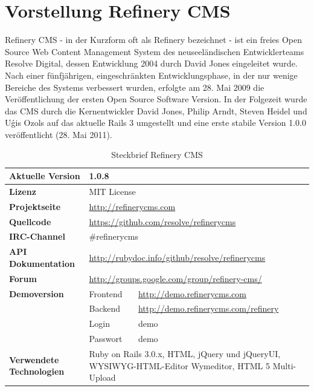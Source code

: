 \section{Vorstellung Refinery CMS}
Refinery CMS - in der Kurzform oft als Refinery bezeichnet - ist ein freies Open Source Web Content Management System des neuseeländischen Entwicklerteams Resolve Digital, dessen Entwicklung 2004 durch David Jones eingeleitet wurde. Nach einer fünfjährigen, eingeschränkten Entwicklungsphase, in der nur wenige Bereiche des Systems verbessert wurden, erfolgte am 28. Mai 2009 die Veröffentlichung der ersten Open Source Software Version. In der Folgezeit wurde das CMS durch die Kernentwickler David Jones, Philip Arndt, Steven Heidel und U\'{g}is Ozols auf das aktuelle Rails 3 umgestellt und eine erste stabile Version 1.0.0 veröffentlicht (28. Mai 2011).
\begin{table}[!h]
\caption{Steckbrief Refinery CMS}
\begin{tabular}[!ht]{|l|l|l|}
\hline
\textbf{Aktuelle Version} & \multicolumn{2}{p{10cm}|}{1.0.8} \\
\hline
\textbf{Lizenz} & \multicolumn{2}{p{10cm}|}{MIT License} \\
\hline
\textbf{Projektseite} & \multicolumn{2}{p{10cm}|}{\href{http://refinerycms.com}{http://refinerycms.com}} \\
\hline
\textbf{Quellcode} & \multicolumn{2}{p{10cm}|}{\href{https://github.com/resolve/refinerycms}{https://github.com/resolve/refinerycms}} \\
\hline
\textbf{IRC-Channel} & \multicolumn{2}{p{10cm}|}{\#refinerycms} \\
\hline
\textbf{API Dokumentation} & \multicolumn{2}{p{10cm}|}{\href{http://rubydoc.info/github/resolve/refinerycms}{http://rubydoc.info/github/resolve/refinerycms}} \\
\hline
\textbf{Forum} & \multicolumn{2}{p{10cm}|}{\href{http://groups.google.com/group/refinery-cms/}{http://groups.google.com/group/refinery-cms/}} \\
\hline
\textbf{Demoversion} & Frontend & \href{http://demo.refinerycms.com}{http://demo.refinerycms.com} \\
\cline{2-3}
& Backend & \href{http://demo.refinerycms.com/refinery}{http://demo.refinerycms.com/refinery} \\
\cline{2-3}
& Login & demo \\
\cline{2-3}
& Passwort & demo \\
\hline
\textbf{Verwendete Technologien} & \multicolumn{2}{p{10cm}|}{Ruby on Rails 3.0.x, HTML, jQuery und jQueryUI, WYSIWYG-HTML-Editor Wymeditor, HTML 5 Multi-Upload} \\

\end{tabular}
\end{table}
